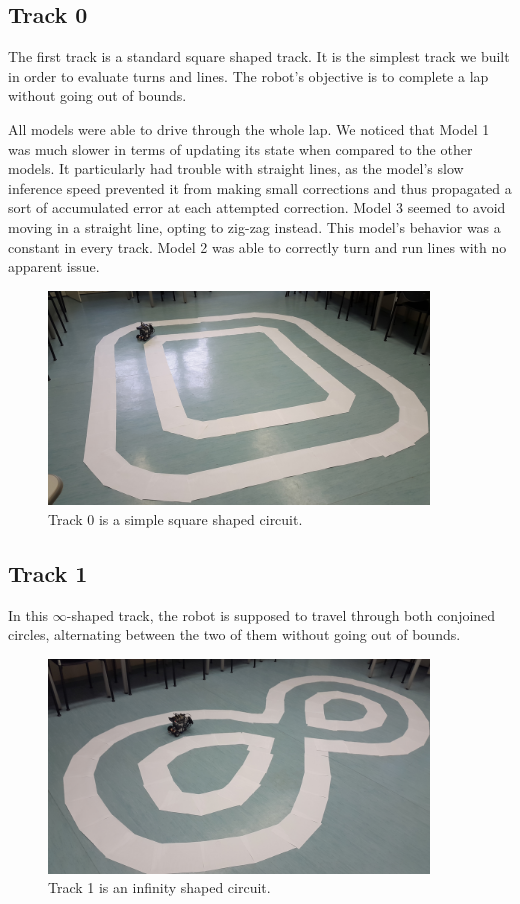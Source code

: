\subsection{Track 0}

The first track is a standard square shaped track. It is the simplest track we built in order to
evaluate turns and lines. The robot's objective is to complete a lap without going out of bounds.

All models were able to drive through the whole lap. We noticed that Model 1 was much slower in
terms of updating its state when compared to the other models. It particularly had trouble with
straight lines, as the model's slow inference speed prevented it from making small corrections and
thus propagated a sort of accumulated error at each attempted correction. Model 3 seemed to avoid
moving in a straight line, opting to zig-zag instead. This model's behavior was a constant in every
track. Model 2 was able to correctly turn and run lines with no apparent issue.

\begin{figure}[h]
  \centering\includegraphics[width=0.9\textwidth]{imgs/track_0.jpg}
  \caption{Track 0 is a simple square shaped circuit.}
\end{figure}

\subsection{Track 1}

In this $\infty$-shaped track, the robot is supposed to travel through both conjoined circles,
alternating between the two of them without going out of bounds.

\begin{figure}[h]
  \centering\includegraphics[width=0.9\textwidth]{imgs/track_1.jpg}
  \caption{Track 1 is an infinity shaped circuit.}
\end{figure}

